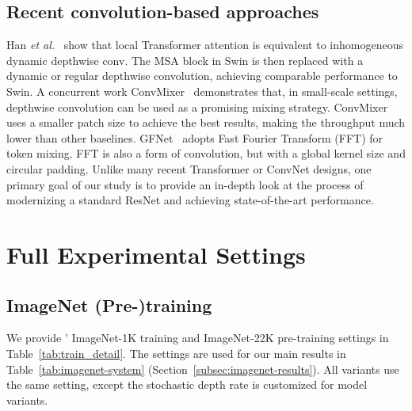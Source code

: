\subsection{Recent convolution-based approaches} 
Han \emph{et al.}~\cite{han2021demystifying} show that local Transformer attention is equivalent to inhomogeneous dynamic depthwise conv. The MSA block in Swin is then replaced with a dynamic or regular depthwise convolution, achieving comparable performance to Swin. A concurrent work ConvMixer~\cite{convmixer} demonstrates that, in small-scale settings, depthwise convolution can be used as a promising mixing strategy. ConvMixer uses a smaller patch size to achieve the best results, making the throughput much lower than other baselines. GFNet~\cite{rao2021global} adopts Fast Fourier Transform (FFT) for token mixing. FFT is also a form of convolution, but with a global kernel size and circular padding. Unlike many recent Transformer or ConvNet designs, one primary goal of our study is to provide an in-depth look at the process of modernizing a standard ResNet and achieving state-of-the-art performance.




\section{Full Experimental Settings}
\label{sec:setting}
\subsection{ImageNet (Pre-)training} 
\label{subsec:setting}
We provide ' ImageNet-1K training and ImageNet-22K pre-training settings in Table~\ref{tab:train_detail}. The settings are used for our main results in Table~\ref{tab:imagenet-system} (Section~\ref{subsec:imagenet-results}).  All \cnn{} variants use the same setting, except the stochastic depth rate is customized for model variants. 

